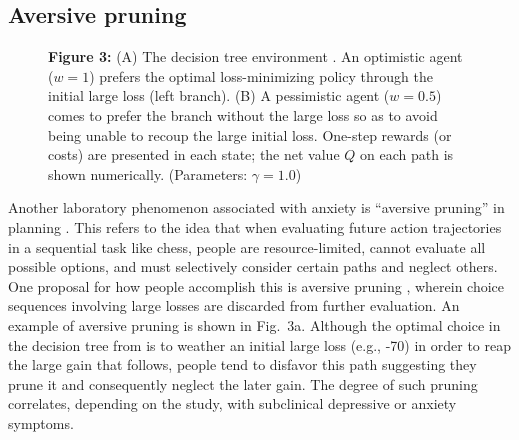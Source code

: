 \documentclass[11pt]{article} %
\begin{document}
\subsection{Aversive pruning} 

\begin{figure}[!b]
  \centerline{%
  }
  \par \textbf{Figure 3:} (A) The decision tree environment \cite{Huys2012,Lally2017}. An optimistic agent ($w=1$) prefers the optimal loss-minimizing policy through the initial large loss (left branch). (B) A pessimistic agent ($w=0.5$) comes to prefer the branch without the large loss so as to avoid being unable to recoup the large initial loss. One-step rewards (or costs) are presented in each state; the net value $Q$ on each path is shown numerically. (Parameters: $\gamma = 1.0$)
\end{figure}

Another laboratory phenomenon associated with anxiety is ``aversive pruning'' in planning \cite{Huys2012, Lally2017}. This refers to the idea that when evaluating future action trajectories in a sequential task like chess, people are resource-limited, cannot evaluate all possible options, and must selectively consider certain paths and neglect others. One proposal for how people accomplish this is aversive pruning \citep{Huys2012}, wherein choice sequences involving large losses are discarded from further evaluation. An example of aversive pruning is shown in Fig.~3a. Although the optimal choice in the decision tree from is to weather an initial large loss (e.g., -70) in order to reap the large gain that follows, people tend to disfavor this path suggesting they prune it and consequently neglect the later gain. The degree of such pruning correlates, depending on the study, with subclinical depressive \cite{Huys2012} or anxiety \cite{Lally2017} symptoms. 
\end{document}

